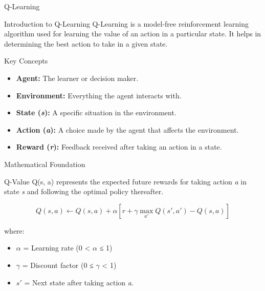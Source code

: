\documentclass[aspectratio=169]{beamer}
\begin{document}
\begin{frame}{Q-Learning}
    \begin{block}{Introduction to Q-Learning}
        Q-Learning is a model-free reinforcement learning algorithm used for learning the value of an action in a particular state. It helps in determining the best action to take in a given state.
    \end{block}
\end{frame}

\begin{frame}{Key Concepts}
    \begin{itemize}
        \item \textbf{Agent:} The learner or decision maker.
        \item \textbf{Environment:} Everything the agent interacts with.
        \item \textbf{State (\textit{s}):} A specific situation in the environment.
        \item \textbf{Action (\textit{a}):} A choice made by the agent that affects the environment.
        \item \textbf{Reward (\textit{r}):} Feedback received after taking an action in a state.
    \end{itemize}
\end{frame}

\begin{frame}{Mathematical Foundation}
    \begin{block}{Q-Value}
        Q(s, a) represents the expected future rewards for taking action \textit{a} in state \textit{s} and following the optimal policy thereafter.
    \end{block}
    
    \begin{equation}
    Q(s, a) \leftarrow Q(s, a) + \alpha \left[r + \gamma \max_{a'} Q(s', a') - Q(s, a)\right]
    \end{equation}
    
    where:
    \begin{itemize}
        \item $\alpha$ = Learning rate (0 < $\alpha$ ≤ 1)
        \item $\gamma$ = Discount factor (0 ≤ $\gamma$ < 1)
        \item $s'$ = Next state after taking action \textit{a}.
    \end{itemize}
\end{frame}
\end{document}
